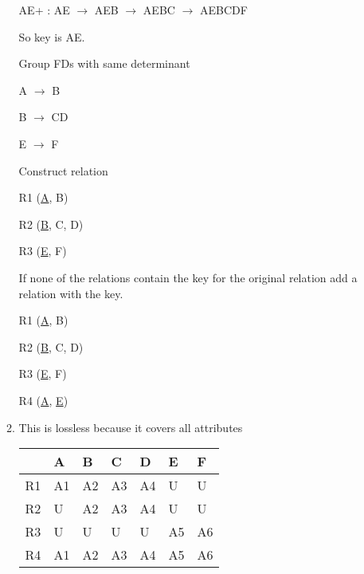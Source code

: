 \documentclass[12pt]{article}
\begin{document}
\begin{enumerate}
\begin{enumerate}
AE+ : AE $\rightarrow$ AEB $\rightarrow$ AEBC  $\rightarrow$ AEBCDF

So key is AE. 

\hrulefill

Group FDs with same determinant

A $\rightarrow$ B

B $\rightarrow$ CD

E $\rightarrow$ F

\hrulefill

Construct relation 

R1 (\underline{A}, B)

R2 (\underline{B}, C, D)

R3 (\underline{E}, F)


\hrulefill

If none of the relations contain the key for the original relation add a relation with the key.

R1 (\underline{A}, B)

R2 (\underline{B}, C, D)

R3 (\underline{E}, F)

R4 (\underline{A}, \underline{E})

\pagebreak

\item %

This is lossless because it covers all attributes

\begin{table}[h]
	\centering
	\begin{tabular}{|l|l|l|l|l|l|l|}
	\hline
	  & A  & B  & C  & D  & E  & F  \\ \hline
	R1 & A1 & A2 & A3 & A4 & U  & U  \\ \hline
	R2 & U  & A2 & A3 & A4 & U  & U  \\ \hline
	R3 & U  & U  & U  & U  & A5 & A6 \\ \hline
	R4 & A1 & A2 & A3 & A4 & A5 & A6 \\ \hline
	\end{tabular}
	\end{table}
	
\end{enumerate}

\end{enumerate}
\end{document}
